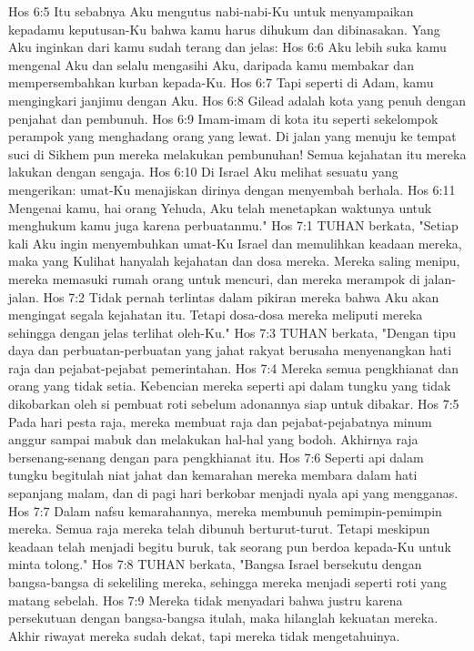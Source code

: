 Hos 6:5  Itu sebabnya Aku mengutus nabi-nabi-Ku untuk menyampaikan kepadamu keputusan-Ku bahwa kamu harus dihukum dan dibinasakan. Yang Aku inginkan dari kamu sudah terang dan jelas:
Hos 6:6  Aku lebih suka kamu mengenal Aku dan selalu mengasihi Aku, daripada kamu membakar dan mempersembahkan kurban kepada-Ku.
Hos 6:7  Tapi seperti di Adam, kamu mengingkari janjimu dengan Aku.
Hos 6:8  Gilead adalah kota yang penuh dengan penjahat dan pembunuh.
Hos 6:9  Imam-imam di kota itu seperti sekelompok perampok yang menghadang orang yang lewat. Di jalan yang menuju ke tempat suci di Sikhem pun mereka melakukan pembunuhan! Semua kejahatan itu mereka lakukan dengan sengaja.
Hos 6:10  Di Israel Aku melihat sesuatu yang mengerikan: umat-Ku menajiskan dirinya dengan menyembah berhala.
Hos 6:11  Mengenai kamu, hai orang Yehuda, Aku telah menetapkan waktunya untuk menghukum kamu juga karena perbuatanmu."
Hos 7:1  TUHAN berkata, "Setiap kali Aku ingin menyembuhkan umat-Ku Israel dan memulihkan keadaan mereka, maka yang Kulihat hanyalah kejahatan dan dosa mereka. Mereka saling menipu, mereka memasuki rumah orang untuk mencuri, dan mereka merampok di jalan-jalan.
Hos 7:2  Tidak pernah terlintas dalam pikiran mereka bahwa Aku akan mengingat segala kejahatan itu. Tetapi dosa-dosa mereka meliputi mereka sehingga dengan jelas terlihat oleh-Ku."
Hos 7:3  TUHAN berkata, "Dengan tipu daya dan perbuatan-perbuatan yang jahat rakyat berusaha menyenangkan hati raja dan pejabat-pejabat pemerintahan.
Hos 7:4  Mereka semua pengkhianat dan orang yang tidak setia. Kebencian mereka seperti api dalam tungku yang tidak dikobarkan oleh si pembuat roti sebelum adonannya siap untuk dibakar.
Hos 7:5  Pada hari pesta raja, mereka membuat raja dan pejabat-pejabatnya minum anggur sampai mabuk dan melakukan hal-hal yang bodoh. Akhirnya raja bersenang-senang dengan para pengkhianat itu.
Hos 7:6  Seperti api dalam tungku begitulah niat jahat dan kemarahan mereka membara dalam hati sepanjang malam, dan di pagi hari berkobar menjadi nyala api yang mengganas.
Hos 7:7  Dalam nafsu kemarahannya, mereka membunuh pemimpin-pemimpin mereka. Semua raja mereka telah dibunuh berturut-turut. Tetapi meskipun keadaan telah menjadi begitu buruk, tak seorang pun berdoa kepada-Ku untuk minta tolong."
Hos 7:8  TUHAN berkata, "Bangsa Israel bersekutu dengan bangsa-bangsa di sekeliling mereka, sehingga mereka menjadi seperti roti yang matang sebelah.
Hos 7:9  Mereka tidak menyadari bahwa justru karena persekutuan dengan bangsa-bangsa itulah, maka hilanglah kekuatan mereka. Akhir riwayat mereka sudah dekat, tapi mereka tidak mengetahuinya.
